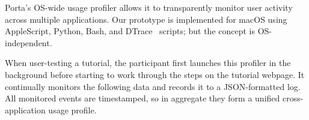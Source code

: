 Porta's OS-wide usage profiler allows it to transparently monitor user
activity across multiple applications. Our prototype is implemented for
macOS using AppleScript, Python, Bash, and DTrace~\cite{Cantrill2004} scripts; but
the concept is OS-independent.


When user-testing a tutorial, the participant first launches this
profiler in the background before starting to work through the steps on
the tutorial webpage. It continually monitors the following data and
records it to a JSON-formatted log. All monitored events are
timestamped, so in aggregate they form a unified cross-application usage
profile.


